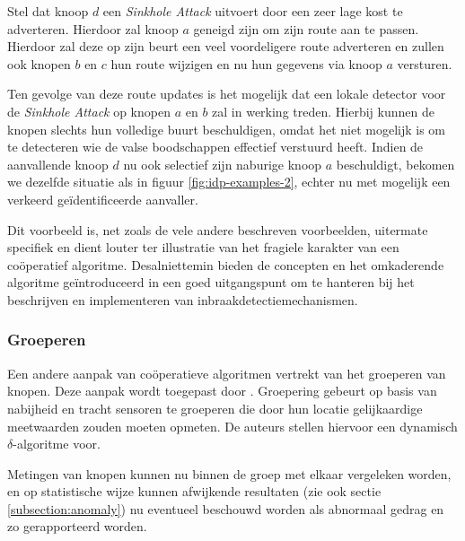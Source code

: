 Stel dat knoop $d$ een \emph{Sinkhole Attack} uitvoert door een zeer lage kost
te adverteren. Hierdoor zal knoop $a$ geneigd zijn om zijn route aan te passen.
Hierdoor zal deze op zijn beurt een veel voordeligere route adverteren en
zullen ook knopen $b$ en $c$ hun route wijzigen en nu hun gegevens via knoop
$a$ versturen.

Ten gevolge van deze route updates is het mogelijk dat een lokale detector voor
de \emph{Sinkhole Attack} op knopen $a$ en $b$ zal in werking treden. Hierbij
kunnen de knopen slechts hun volledige buurt beschuldigen, omdat het niet
mogelijk is om te detecteren wie de valse boodschappen effectief verstuurd
heeft. Indien de aanvallende knoop $d$ nu ook selectief zijn naburige knoop $a$
beschuldigt, bekomen we dezelfde situatie als in figuur
\ref{fig:idp-examples-2}, echter nu met mogelijk een verkeerd
ge\"identificeerde aanvaller.

Dit voorbeeld is, net zoals de vele andere beschreven voorbeelden, uitermate
specifiek en dient louter ter illustratie van het fragiele karakter van een
co\"operatief algoritme. Desalniettemin bieden de concepten en het omkaderende
algoritme ge\"introduceerd in \citep{krontiris2009cooperative} een goed
uitgangspunt om te hanteren bij het beschrijven en implementeren van
inbraakdetectiemechanismen.

\subsubsection*{Groeperen}
\label{subsubsection:grouping}

Een andere aanpak van co\"operatieve algoritmen vertrekt van het groeperen van
knopen. Deze aanpak wordt toegepast door \citep{li2008group}. Groepering gebeurt
op basis van nabijheid en tracht sensoren te groeperen die door hun locatie
gelijkaardige meetwaarden zouden moeten opmeten. De auteurs stellen hiervoor
een dynamisch $\delta$-algoritme voor.

Metingen van knopen kunnen nu binnen de groep met elkaar vergeleken worden, en
op statistische wijze kunnen afwijkende resultaten (zie ook sectie
\ref{subsection:anomaly}) nu eventueel beschouwd worden als abnormaal gedrag en zo
gerapporteerd worden.
